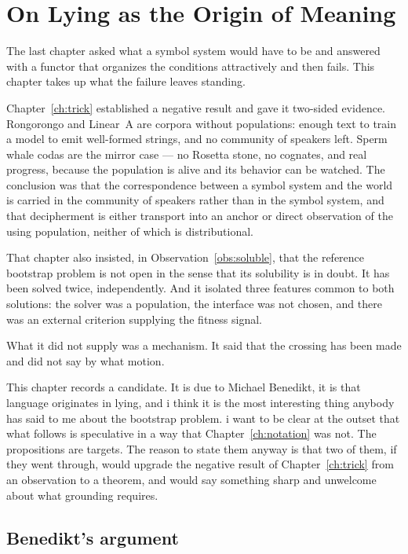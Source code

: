 \chapter{On Lying as the Origin of Meaning}
\label{ch:lie}

The last chapter asked what a symbol system would have to be and answered with a
functor that organizes the conditions attractively and then fails. This chapter
takes up what the failure leaves standing.

Chapter~\ref{ch:trick} established a negative result and gave it two-sided
evidence. Rongorongo and Linear~A are corpora without populations: enough text to
train a model to emit well-formed strings, and no community of speakers left.
Sperm whale codas are the mirror case --- no Rosetta stone, no cognates, and
real progress, because the population is alive and its behavior can be watched.
The conclusion was that the correspondence between a symbol system and the world
is carried in the community of speakers rather than in the symbol system, and
that decipherment is either transport into an anchor or direct observation of the
using population, neither of which is distributional.

That chapter also insisted, in Observation~\ref{obs:soluble}, that the reference
bootstrap problem is not open in the sense that its solubility is in doubt. It
has been solved twice, independently. And it isolated three features common to
both solutions: the solver was a population, the interface was not chosen, and
there was an external criterion supplying the fitness signal.

What it did not supply was a mechanism. It said that the crossing has been made
and did not say by what motion.

This chapter records a candidate. It is due to Michael Benedikt, it is that
language originates in lying, and i think it is the most interesting thing
anybody has said to me about the bootstrap problem. i want to be clear at the
outset that what follows is speculative in a way that Chapter~\ref{ch:notation}
was not. The propositions are targets. The reason to state them anyway is that
two of them, if they went through, would upgrade the negative result of
Chapter~\ref{ch:trick} from an observation to a theorem, and would say something
sharp and unwelcome about what grounding requires.

\section{Benedikt's argument}
\label{sec:benedikt}

